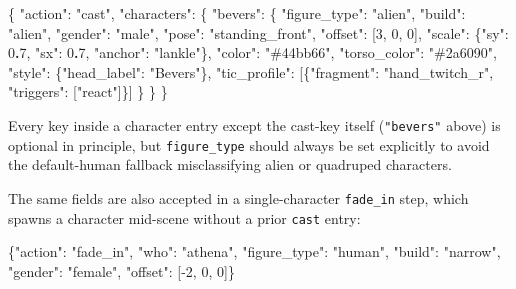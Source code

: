 \documentclass[
  12pt,
  letterpaper,
]{book}
\newenvironment{Shaded}{}{}
\newcommand{\DataTypeTok}[1]{\textcolor[rgb]{0.56,0.13,0.00}{#1}}
\newcommand{\DecValTok}[1]{\textcolor[rgb]{0.25,0.63,0.44}{#1}}
\newcommand{\ErrorTok}[1]{\textcolor[rgb]{1.00,0.00,0.00}{\textbf{#1}}}
\newcommand{\FunctionTok}[1]{\textcolor[rgb]{0.02,0.16,0.49}{#1}}
\newcommand{\OtherTok}[1]{\textcolor[rgb]{0.00,0.44,0.13}{#1}}
\newcommand{\StringTok}[1]{\textcolor[rgb]{0.25,0.44,0.63}{#1}}
\begin{document}
\begin{Shaded}
\begin{Highlighting}[]
\FunctionTok{\{}
  \DataTypeTok{"action"}\FunctionTok{:} \StringTok{"cast"}\FunctionTok{,}
  \DataTypeTok{"characters"}\FunctionTok{:} \FunctionTok{\{}
    \DataTypeTok{"bevers"}\FunctionTok{:} \FunctionTok{\{}
      \DataTypeTok{"figure\_type"}\FunctionTok{:} \StringTok{"alien"}\FunctionTok{,}
      \DataTypeTok{"build"}\FunctionTok{:} \StringTok{"alien"}\FunctionTok{,}
      \DataTypeTok{"gender"}\FunctionTok{:} \StringTok{"male"}\FunctionTok{,}
      \DataTypeTok{"pose"}\FunctionTok{:} \StringTok{"standing\_front"}\FunctionTok{,}
      \DataTypeTok{"offset"}\FunctionTok{:} \OtherTok{[}\DecValTok{3}\OtherTok{,} \DecValTok{0}\OtherTok{,} \DecValTok{0}\OtherTok{]}\FunctionTok{,}
      \DataTypeTok{"scale"}\FunctionTok{:} \FunctionTok{\{}\DataTypeTok{"sy"}\FunctionTok{:} \DecValTok{0}\ErrorTok{.}\DecValTok{7}\FunctionTok{,} \DataTypeTok{"sx"}\FunctionTok{:} \DecValTok{0}\ErrorTok{.}\DecValTok{7}\FunctionTok{,} \DataTypeTok{"anchor"}\FunctionTok{:} \StringTok{"lankle"}\FunctionTok{\},}
      \DataTypeTok{"color"}\FunctionTok{:} \StringTok{"\#44bb66"}\FunctionTok{,}
      \DataTypeTok{"torso\_color"}\FunctionTok{:} \StringTok{"\#2a6090"}\FunctionTok{,}
      \DataTypeTok{"style"}\FunctionTok{:} \FunctionTok{\{}\DataTypeTok{"head\_label"}\FunctionTok{:} \StringTok{"Bevers"}\FunctionTok{\},}
      \DataTypeTok{"tic\_profile"}\FunctionTok{:} \OtherTok{[}\FunctionTok{\{}\DataTypeTok{"fragment"}\FunctionTok{:} \StringTok{"hand\_twitch\_r"}\FunctionTok{,} \DataTypeTok{"triggers"}\FunctionTok{:} \OtherTok{[}\StringTok{"react"}\OtherTok{]}\FunctionTok{\}}\OtherTok{]}
    \FunctionTok{\}}
  \FunctionTok{\}}
\FunctionTok{\}}
\end{Highlighting}
\end{Shaded}

Every key inside a character entry except the cast-key itself
(\texttt{"bevers"} above) is optional in principle, but
\texttt{figure\_type} should always be set explicitly to avoid the
default-human fallback misclassifying alien or quadruped characters.

The same fields are also accepted in a single-character
\texttt{fade\_in} step, which spawns a character mid-scene without a
prior \texttt{cast} entry:

\begin{Shaded}
\begin{Highlighting}[]
\FunctionTok{\{}\DataTypeTok{"action"}\FunctionTok{:} \StringTok{"fade\_in"}\FunctionTok{,} \DataTypeTok{"who"}\FunctionTok{:} \StringTok{"athena"}\FunctionTok{,}
 \DataTypeTok{"figure\_type"}\FunctionTok{:} \StringTok{"human"}\FunctionTok{,} \DataTypeTok{"build"}\FunctionTok{:} \StringTok{"narrow"}\FunctionTok{,} \DataTypeTok{"gender"}\FunctionTok{:} \StringTok{"female"}\FunctionTok{,}
 \DataTypeTok{"offset"}\FunctionTok{:} \OtherTok{[}\DecValTok{{-}2}\OtherTok{,} \DecValTok{0}\OtherTok{,} \DecValTok{0}\OtherTok{]}\FunctionTok{\}}
\end{Highlighting}
\end{Shaded}
\end{document}
